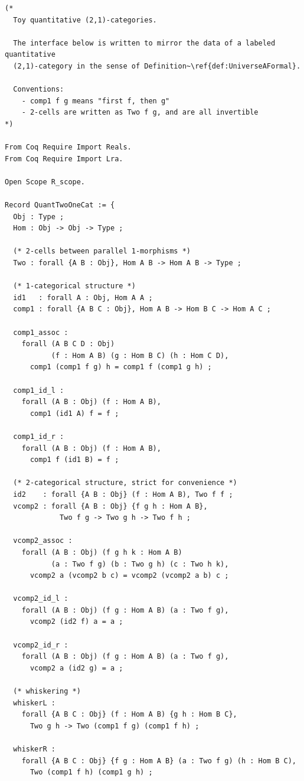 \documentclass[10pt, reqno]{amsart}
\theoremstyle{plain}
\theoremstyle{definition}
\theoremstyle{plain}
\begin{document}
\begin{scriptsize}
\begin{verbatim}
(*
  Toy quantitative (2,1)-categories.

  The interface below is written to mirror the data of a labeled quantitative
  (2,1)-category in the sense of Definition~\ref{def:UniverseAFormal}.

  Conventions:
    - comp1 f g means "first f, then g"
    - 2-cells are written as Two f g, and are all invertible
*)

From Coq Require Import Reals.
From Coq Require Import Lra.

Open Scope R_scope.

Record QuantTwoOneCat := {
  Obj : Type ;
  Hom : Obj -> Obj -> Type ;

  (* 2-cells between parallel 1-morphisms *)
  Two : forall {A B : Obj}, Hom A B -> Hom A B -> Type ;

  (* 1-categorical structure *)
  id1   : forall A : Obj, Hom A A ;
  comp1 : forall {A B C : Obj}, Hom A B -> Hom B C -> Hom A C ;

  comp1_assoc :
    forall (A B C D : Obj)
           (f : Hom A B) (g : Hom B C) (h : Hom C D),
      comp1 (comp1 f g) h = comp1 f (comp1 g h) ;

  comp1_id_l :
    forall (A B : Obj) (f : Hom A B),
      comp1 (id1 A) f = f ;

  comp1_id_r :
    forall (A B : Obj) (f : Hom A B),
      comp1 f (id1 B) = f ;

  (* 2-categorical structure, strict for convenience *)
  id2    : forall {A B : Obj} (f : Hom A B), Two f f ;
  vcomp2 : forall {A B : Obj} {f g h : Hom A B},
             Two f g -> Two g h -> Two f h ;

  vcomp2_assoc :
    forall (A B : Obj) (f g h k : Hom A B)
           (a : Two f g) (b : Two g h) (c : Two h k),
      vcomp2 a (vcomp2 b c) = vcomp2 (vcomp2 a b) c ;

  vcomp2_id_l :
    forall (A B : Obj) (f g : Hom A B) (a : Two f g),
      vcomp2 (id2 f) a = a ;

  vcomp2_id_r :
    forall (A B : Obj) (f g : Hom A B) (a : Two f g),
      vcomp2 a (id2 g) = a ;

  (* whiskering *)
  whiskerL :
    forall {A B C : Obj} (f : Hom A B) {g h : Hom B C},
      Two g h -> Two (comp1 f g) (comp1 f h) ;

  whiskerR :
    forall {A B C : Obj} {f g : Hom A B} (a : Two f g) (h : Hom B C),
      Two (comp1 f h) (comp1 g h) ;


\end{verbatim}
\end{scriptsize}
\end{document}
